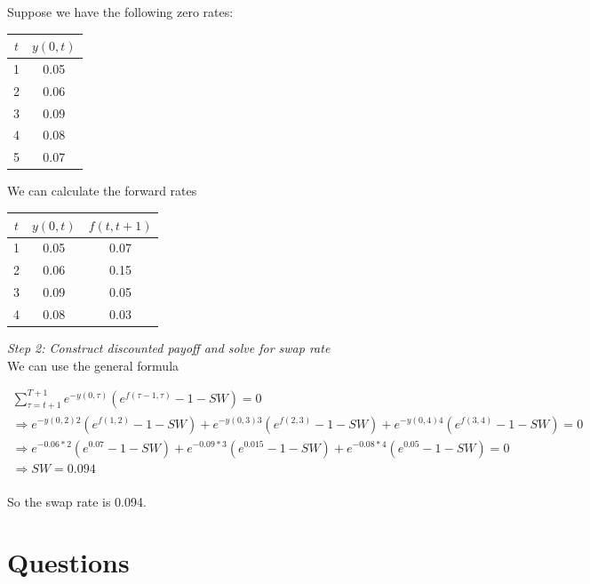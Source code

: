 \documentclass{tran-l}
\theoremstyle{definition}
\theoremstyle{remark}
\numberwithin{equation}{subsection}
\begin{document}
Suppose we have the following zero rates:\\
\begin{center}
\begin{tabular}{|c|c|}
  \hline
  $t$ & $y(0,t)$ \\
  \hline
  1&0.05 \\
  2&0.06 \\
  3&0.09 \\
  4&0.08 \\
  5&0.07\\
  \hline
\end{tabular}
\end{center}
We can calculate the forward rates\\
\begin{center}
\begin{tabular}{|c|c|c|}
  \hline
  $t$ & $y(0,t)$ & $f(t,t+1)$ \\
  \hline
  1&0.05 & 0.07\\
  2&0.06 & 0.15\\
  3&0.09 & 0.05 \\
  4&0.08 & 0.03\\
  \hline
\end{tabular}
\end{center}

\textit{Step 2: Construct discounted payoff and solve for swap rate}\\

We can use the general formula

\begin{eqnarray*}
\sum_{\tau=t+1}^{T+1}  e^{-y(0,\tau)}(e^{f(\tau-1,\tau)}-1 -SW) = 0 \\
\Rightarrow e^{-y(0,2)2}(e^{f(1,2)} - 1 - SW) + e^{-y(0,3)3}(e^{f(2,3)} - 1 - SW)+ e^{-y(0,4)4}(e^{f(3,4)} - 1 - SW) =0\\
\Rightarrow e^{-0.06*2}(e^{0.07} - 1 - SW) + e^{-0.09*3}(e^{0.015} - 1 - SW)+ e^{-0.08*4}(e^{0.05} - 1 - SW) =0\\
\Rightarrow SW = 0.094\\
\end{eqnarray*}

So the swap rate is 0.094.

\section{Questions}
\end{document}
